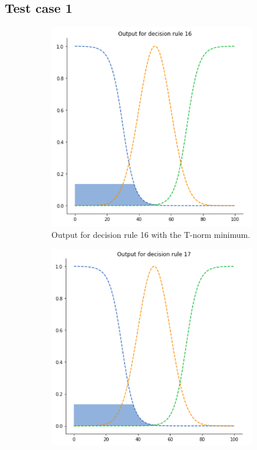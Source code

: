 \documentclass[conference]{IEEEtran}
\begin{document}
\subsection{Test case 1}
\begin{figure}[ht]
\begin{subfigure}{.5\textwidth}
  \centering
  \includegraphics[width=.8\linewidth]{figures/first/min1.png}  
  \caption{Output for decision rule 16 with the T-norm minimum.}
  \label{fig:1min1}
\end{subfigure}
\begin{subfigure}{.5\textwidth}
  \centering
  \includegraphics[width=.8\linewidth]{figures/first/min2.png}  

\end{subfigure}
\end{figure}
\end{document}

